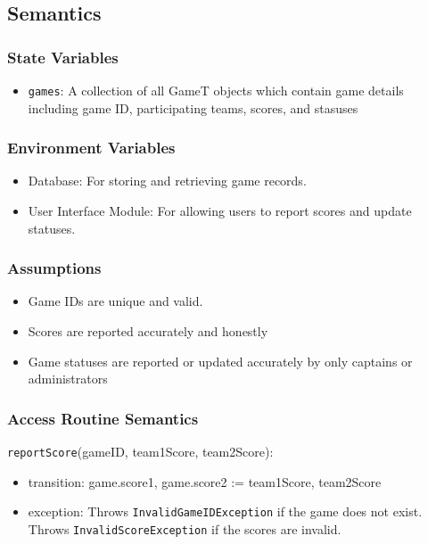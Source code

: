 \documentclass[12pt, titlepage]{article}
\begin{document}
\subsection{Semantics}

\subsubsection{State Variables}

\begin{itemize}
  \item \texttt{games}: A collection of all GameT objects which contain game details including game ID, participating teams, scores, and stasuses
\end{itemize}

\subsubsection{Environment Variables}

\begin{itemize}
  \item Database: For storing and retrieving game records.
  \item User Interface Module: For allowing users to report scores and update statuses.
\end{itemize}

\subsubsection{Assumptions}

\begin{itemize}
  \item Game IDs are unique and valid.
  \item Scores are reported accurately and honestly
  \item Game statuses are reported or updated accurately by only captains or administrators
\end{itemize}

\subsubsection{Access Routine Semantics}

\noindent \texttt{reportScore}(gameID, team1Score, team2Score):
\begin{itemize}
  \item transition: game.score1, game.score2 := team1Score, team2Score
  \item exception: Throws \texttt{InvalidGameIDException} if the game does not exist. Throws \texttt{InvalidScoreException} if the scores are invalid.
\end{itemize}
\end{document}

